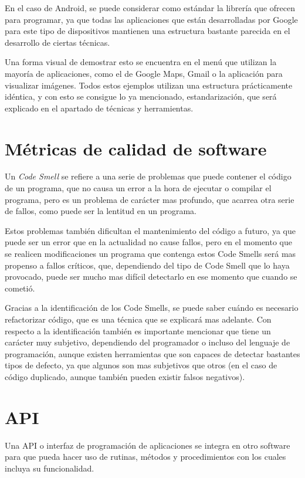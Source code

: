 En el caso de Android, se puede considerar como estándar la librería que ofrecen para programar, ya que todas las aplicaciones que están desarrolladas por Google para este tipo de dispositivos mantienen una estructura bastante parecida en el desarrollo de ciertas técnicas.

Una forma visual de demostrar esto se encuentra en el menú que utilizan la mayoría de aplicaciones, como el de Google Maps, Gmail o la aplicación para visualizar imágenes. Todos estos ejemplos utilizan una estructura prácticamente idéntica, y con esto se consigue lo ya mencionado, estandarización, que será explicado en el apartado de técnicas y herramientas.

\section{Métricas de calidad de software}

\cite{refac2}

Un \textit{Code Smell} se refiere a una serie de problemas que puede contener el código de un programa, que no causa un error a la hora de ejecutar o compilar el programa, pero es un problema de carácter mas profundo, que acarrea otra serie de fallos, como puede ser la lentitud en un programa.

Estos problemas también dificultan el mantenimiento del código a futuro, ya que puede ser un error que en la actualidad no cause fallos, pero en el momento que se realicen modificaciones un programa que contenga estos Code Smells será mas propenso a fallos críticos, que, dependiendo del tipo de Code Smell que lo haya provocado, puede ser mucho mas difícil detectarlo en ese momento que cuando se cometió.

Gracias a la identificación de los Code Smells, se puede saber cuándo es necesario refactorizar código, que es una técnica que se explicará mas adelante. Con respecto a la identificación también es importante mencionar que tiene un carácter muy subjetivo, dependiendo del programador o incluso del lenguaje de programación, aunque existen herramientas que son capaces de detectar bastantes tipos de defecto, ya que algunos son mas subjetivos que otros (en el caso de código duplicado, aunque también pueden existir falsos negativos).

\section{API}

Una API \cite{api1} o interfaz de programación de aplicaciones \cite{api2} se integra en otro software para que pueda hacer uso de rutinas, métodos y procedimientos con los cuales incluya su funcionalidad.

